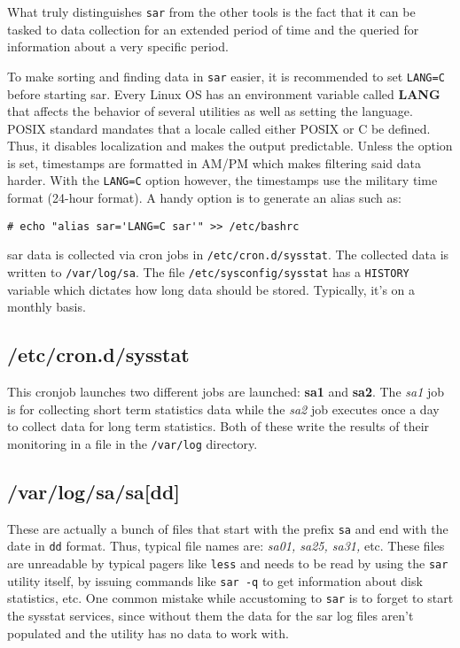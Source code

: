 What truly distinguishes \verb|sar| from the other tools is the fact that it can be tasked to data collection for an extended period of time and the queried for information about a very specific period. 

To make sorting and finding data in \verb|sar| easier, it is recommended to set \verb|LANG=C| before starting sar. Every Linux OS has an environment variable called \textbf{LANG} that affects the behavior of several utilities as well as setting the language. POSIX standard mandates that a locale called either POSIX or C be defined. Thus, it disables localization and makes the output predictable. Unless the option is set, timestamps are formatted in AM/PM which makes filtering said data harder. With the \verb|LANG=C| option however, the timestamps use the military time format (24-hour format). A handy option is to generate an alias such as:

\vspace{-15pt}
\begin{verbatim}
# echo "alias sar='LANG=C sar'" >> /etc/bashrc
\end{verbatim}
\vspace{-10pt}	

\noindent
sar data is collected via cron jobs in \verb|/etc/cron.d/sysstat|. The collected data is written to \verb|/var/log/sa|. The file \verb|/etc/sysconfig/sysstat| has a \verb|HISTORY| variable which dictates how long data should be stored. Typically, it's on a monthly basis. 

\subsection{/etc/cron.d/sysstat}
This cronjob launches two different jobs are launched: \textbf{sa1} and \textbf{sa2}. The \textit{sa1} job is for collecting short term statistics data while the \textit{sa2} job executes once a day to collect data for long term statistics. Both of these write the results of their monitoring in a file in the \verb|/var/log| directory. 

\subsection{/var/log/sa/sa[dd]}
These are actually a bunch of files that start with the prefix \verb|sa| and end with the date in \verb|dd| format. Thus, typical file names are: \textit{sa01, sa25, sa31,} etc. These files are unreadable by typical pagers like \verb|less| and needs to be read by using the \verb|sar| utility itself, by issuing commands like \verb|sar -q| to get information about disk statistics, etc. One common mistake while accustoming to \verb|sar| is to forget to start the sysstat services, since without them the data for the sar log files aren't populated and the utility has no data to work with. 

